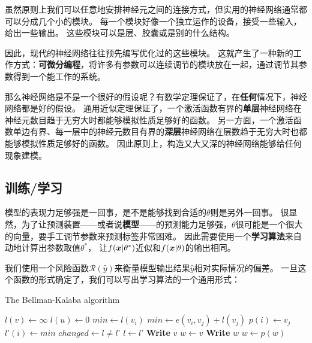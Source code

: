 \documentclass[UTF8, a4paper]{ctexart}
\begin{document}
虽然原则上我们可以任意地安排神经元之间的连接方式，但实用的神经网络通常都可以分成几个小的模块。
每一个模块好像一个独立运作的设备，接受一些输入，给出一些输出。
这些模块可以是层、胶囊或是别的什么结构。

因此，现代的神经网络往往预先编写优化过的这些模块。
这就产生了一种新的工作方式：\textbf{可微分编程}，将许多有参数可以连续调节的模块放在一起，通过调节其参数得到一个能工作的系统。

那么神经网络是不是一个很好的假设呢？有数学定理保证了，在\textbf{任何}情况下，神经网络都是好的假设。
通用近似定理保证了，一个激活函数有界的\textbf{单层}神经网络在神经元数目趋于无穷大时都能够模拟性质足够好的函数。
另一方面，一个激活函数单边有界、每一层中的神经元数目有界的\textbf{深层}神经网络在层数趋于无穷大时也都能够模拟性质足够好的函数。
因此原则上，构造又大又深的神经网络能够给任何现象建模。

\subsection{训练/学习}

模型的表现力足够强是一回事，是不是能够找到合适的$\theta$则是另外一回事。
很显然，为了让预测装置——或者说\textbf{模型}——的预测能力足够强，$\theta$很可能是一个很大的向量，要手工调节参数来预测标签非常困难。
因此需要使用一个\textbf{学习算法}来自动地计算出参数取值$\theta^*$，
让$f(\vb*{x}|\theta^*)$近似和$f(\vb*{x}|\theta)$的输出相同。

我们使用一个风险函数$\mathcal{R}(\hat{y})$来衡量模型输出结果$\hat{y}$相对实际情况的偏差。
一旦这个函数的形式确定了，我们可以写出学习算法的一个通用形式：
\begin{algorithm}
    \caption{The Bellman-Kalaba algorithm}
    \begin{algorithmic}[1]
    \State $l(v) \leftarrow \infty$
    \EndFor
    \State $l(u) \leftarrow 0$
    \Repeat
    \State $min \leftarrow l(v_i)$
    \State $min \leftarrow e(v_i, v_j) + l(v_j)$
    \State $p(i) \leftarrow v_j$
    \EndIf
    \EndFor
    \State $l’(i) \leftarrow min$
    \EndFor
    \State $changed \leftarrow l \not= l’$
    \State $l \leftarrow l’$
    \EndFunction
    \Statex
    \State \textbf{Write} $v$
    \Else
    \State $w \leftarrow v$
    \State \textbf{Write} $w$
    \State $w \leftarrow p(w)$
    \EndWhile
    \EndIf
    \EndFunction
    \end{algorithmic}
\end{algorithm}
\end{document}

